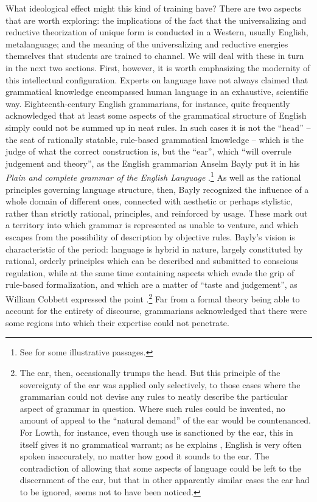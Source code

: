 \documentclass[output=paper]{langscibook}
\begin{document}
What ideological effect might this kind of training have? There are two aspects that are worth exploring: the implications of the fact that the universalizing and reductive theorization of unique form is conducted in a Western, usually English, metalanguage; and the meaning of the universalizing and reductive energies themselves that students are trained to channel. We will deal with these in turn in the next two sections. First, however, it is worth emphasizing the modernity of this intellectual configuration. Experts on language have not always claimed that grammatical knowledge encompassed human language in an exhaustive, scientific way. Eighteenth-century English grammarians, for instance, quite frequently acknowledged that at least some aspects of the grammatical structure of English simply could not be summed up in neat rules. In such cases it is not the ``head'' -- the seat of rationally statable, rule-based grammatical knowledge -- which is the judge of what the correct construction is, but the ``ear'', which ``will overrule judgement and theory'', as the English grammarian Anselm Bayly put it in his \citeyear{Bayly1772} \emph{Plain and complete grammar of the English Language} \citep[61]{Bayly1772}.\footnote{See \citet[26, 44]{Bayly1772} for some illustrative passages.} As well as the rational principles governing language structure, then, Bayly recognized the influence of a whole domain of different ones, connected with aesthetic or perhaps stylistic, rather than strictly rational, principles, and reinforced by usage. These mark out a territory into which grammar is represented as unable to venture, and which escapes from the possibility of description by objective rules. Bayly's vision is characteristic of the period: language is hybrid in nature, largely constituted by rational, orderly principles which can be described and submitted to conscious regulation, while at the same time containing aspects which evade the grip of rule-based formalization, and which are a matter of ``taste and judgement'', as William Cobbett expressed the point \citep[56]{Cobbett19831818}.\footnote{The ear, then, occasionally trumps the head. But this principle of the sovereignty of the ear was applied only selectively, to those cases where the grammarian could not devise any rules to neatly describe the particular aspect of grammar in question. Where such rules could be invented, no amount of appeal to the ``natural demand'' of the ear would be countenanced. For Lowth, for instance, even though  use is sanctioned by the ear, this in itself gives it no grammatical warrant; as he explains \citep[9]{Lowth1762}, English is very often spoken inaccurately, no matter how good it sounds to the ear. The contradiction of allowing that some aspects of language could be left to the discernment of the ear, but that in other apparently similar cases the ear had to be ignored, seems not to have been noticed.} Far from a formal theory being able to account for the entirety of discourse, grammarians acknowledged that there were some regions into which their expertise could not penetrate.
\end{document}
